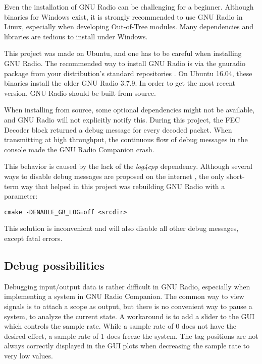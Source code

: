 Even the installation of GNU Radio can be challenging for a beginner. Although binaries for Windows exist, it is strongly recommended to use GNU Radio in Linux, especially when developing Out-of-Tree modules. Many dependencies and libraries are tedious to install under Windows. \medskip

This project was made on Ubuntu, and one has to be careful when installing GNU Radio. The recommended way %
to install GNU Radio is via the gnuradio package from your distribution's standard repositories \cite{gr_install}. On Ubuntu 16.04, these binaries install the older GNU Radio 3.7.9. In order to get the most recent version, GNU Radio should be built from source.\medskip

When installing from source, some optional dependencies might not be available, and GNU Radio will not explicitly notify this. During this project, the FEC Decoder block returned a debug message for every decoded packet. When transmitting at high throughput, the continuous flow of debug messages in the console made the GNU Radio Companion crash.\medskip

This behavior is caused by the lack of the \textit{log4cpp} dependency. Although several ways to disable debug messages are proposed on the internet \cite{gr_logging} , the only short-term way that helped in this project was rebuilding GNU Radio with a parameter: %
\begin{verbatim}
cmake -DENABLE_GR_LOG=off <srcdir>
\end{verbatim}
This solution is inconvenient and will also disable all other debug messages, except fatal errors.

\subsection{Debug possibilities}
Debugging input/output data is rather difficult in GNU Radio, especially when implementing a system in GNU Radio Companion. The common way to view signals is to attach a scope as output, but there is no convenient way to pause a system, to analyze the current state. A workaround is to add a slider to the GUI which controls the sample rate. While a sample rate of 0 does not have the desired effect, a sample rate of 1 does freeze the system. The tag positions are not always correctly displayed in the GUI plots when decreasing the sample rate to very low values. \medskip

